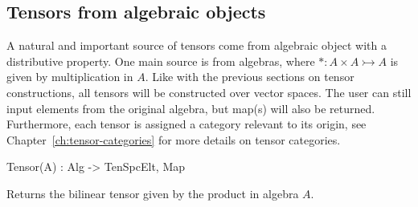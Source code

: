 \subsection{Tensors from algebraic objects}
A natural and important source of tensors come from algebraic object with a
distributive property. One main source is from algebras, where $*:A\times
A\rightarrowtail A$ is given by multiplication in $A$. Like with the previous
sections on tensor constructions, all tensors will be constructed over vector
spaces. The user can still input elements from the original algebra, but map(s)
will also be returned. Furthermore, each tensor is assigned a category relevant
to its origin, see Chapter~\ref{ch:tensor-categories} for more details on tensor
categories. 


\begin{intrinsics}
Tensor(A) : Alg -> TenSpcElt, Map
\end{intrinsics}

Returns the bilinear tensor given by the product in algebra $A$.

